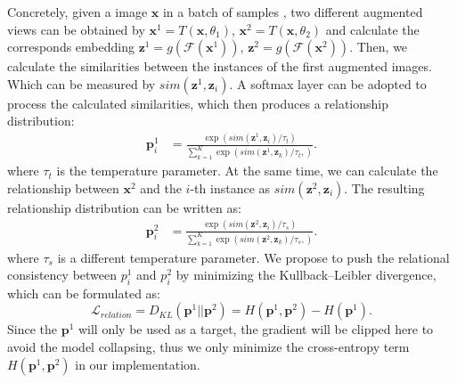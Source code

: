 \documentclass{article}
\newcommand{\<}{\left\langle}
\renewcommand{\>}{\right\rangle}
\begin{document}
Concretely, given a image $\mathbf{x}$ in a batch of samples , two different augmented views can be obtained by $\mathbf{x}^1 = T(\mathbf{x}, \theta_1)$, $\mathbf{x}^2 = T(\mathbf{x}, \theta_2)$ and calculate the corresponds embedding  $\mathbf{z}^1 = g(\mathcal{F} (\mathbf{x}^1))$, $\mathbf{z}^2 = g(\mathcal{F}(\mathbf{x}^2))$. Then, we calculate the similarities between the instances of the first augmented images. Which can be measured by $sim(\mathbf{z}^{1}, \mathbf{z}_{i})$. A softmax layer can be adopted to process the calculated similarities, which then produces a relationship distribution:
\begin{align}
    \mathbf{p}^1_i &= \frac{\exp(sim(\mathbf{z}^{1}, \mathbf{z}_{i})/ \tau_t) }{\sum_{k=1}^{K}  \exp(sim(\mathbf{z}^{1}, \mathbf{z}_{k}) / \tau_t, ) }. \label{equation:teacher}
\end{align}
where $\tau_t$ is the temperature parameter. At the same time, we can calculate the relationship between $\mathbf{x}^2$ and the $i$-th instance as $sim(\mathbf{z}^{2}, \mathbf{z}_{i})$. The resulting relationship distribution can be written as:
\begin{align}
    \mathbf{p}^2_i &= \frac{\exp(sim(\mathbf{z}^{2}, \mathbf{z}_{i})/ \tau_s) }{\sum_{k=1}^{K}  \exp(sim(\mathbf{z}^{2}, \mathbf{z}_{k}) / \tau_s, ) }. \label{equation:student}
\end{align}
where $\tau_s$ is a different temperature parameter. We propose to push the relational consistency between $p^{1}_i$ and $p^{2}_i$ by minimizing the Kullback–Leibler divergence, which can be formulated as:
\begin{equation}
    \label{equation:loss}
    \mathcal{L}_{relation} =  D_{KL} (\mathbf{p}^1 || \mathbf{p}^2) = H(\mathbf{p}^1, \mathbf{p}^2) - H(\mathbf{p}^1).
\end{equation}
Since the $\mathbf{p}^1$ will only be used as a target, the gradient will be clipped here to avoid the model collapsing, thus we only minimize the cross-entropy term $H(\mathbf{p}^1,\mathbf{p}^2)$ in our implementation.
\end{document}
